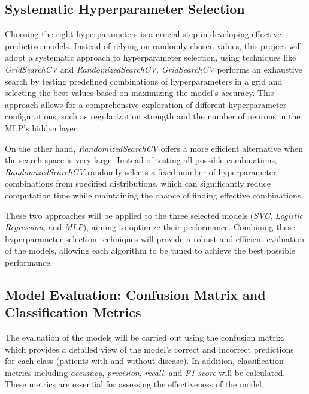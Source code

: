 \subsection{Systematic Hyperparameter Selection}
Choosing the right hyperparameters is a crucial step in developing effective predictive models. Instead of relying on randomly chosen values, this project will adopt a systematic approach to hyperparameter selection, using techniques like \textit{GridSearchCV} and \textit{RandomizedSearchCV}. \textit{GridSearchCV} performs an exhaustive search by testing predefined combinations of hyperparameters in a grid and selecting the best values based on maximizing the model’s accuracy. This approach allows for a comprehensive exploration of different hyperparameter configurations, such as regularization strength and the number of neurons in the MLP’s hidden layer.

On the other hand, \textit{RandomizedSearchCV} offers a more efficient alternative when the search space is very large. Instead of testing all possible combinations, \textit{RandomizedSearchCV} randomly selects a fixed number of hyperparameter combinations from specified distributions, which can significantly reduce computation time while maintaining the chance of finding effective combinations.

These two approaches will be applied to the three selected models (\textit{SVC}, \textit{Logistic Regression}, and \textit{MLP}), aiming to optimize their performance. Combining these hyperparameter selection techniques will provide a robust and efficient evaluation of the models, allowing each algorithm to be tuned to achieve the best possible performance.

\subsection{Model Evaluation: Confusion Matrix and Classification Metrics}
The evaluation of the models will be carried out using the confusion matrix, which provides a detailed view of the model’s correct and incorrect predictions for each class (patients with and without disease). In addition, classification metrics including \textit{accuracy}, \textit{precision}, \textit{recall}, and \textit{F1-score} will be calculated. These metrics are essential for assessing the effectiveness of the model. 

